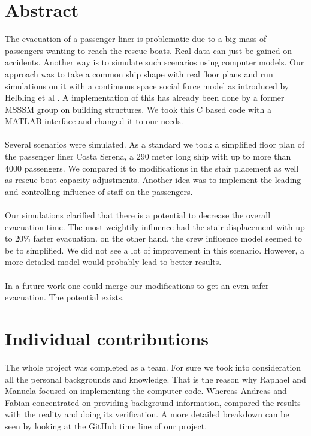 \documentclass[11pt]{article}
\begin{document}
\section{Abstract}
The evacuation of a passenger liner is problematic due to a big mass of passengers wanting to reach the rescue boats. Real data can just be gained on accidents. Another way is to simulate such scenarios using computer models. Our approach was to take a common ship shape with real floor plans and run simulations on it with a continuous space social force model as introduced by Helbling et al \cite{EscapePanic}. A implementation of this has already been done by a former MSSSM group \cite{Building} on building structures. We took this C based code with a MATLAB interface and changed it to our needs. \\\\
Several scenarios were simulated. As a standard we took a simplified floor plan of the passenger liner Costa Serena, a 290 meter long ship with up to more than 4000 passengers. We compared it to modifications in the stair placement as well as rescue boat capacity adjustments. Another idea was to implement the leading and controlling influence of staff on the passengers.\\\\
Our simulations clarified that there is a potential to decrease the overall evacuation time. The most weightily influence had the stair displacement with up to 20\% faster evacuation. on the other hand, the crew influence model seemed to be to simplified. We did not see a lot of improvement in this scenario. However, a more detailed model would probably lead to better results.\\\\
In a future work one could merge our modifications to get an even safer evacuation. The potential exists.




\section{Individual contributions}
The whole project was completed as a team. For sure we took into consideration all the personal backgrounds and  knowledge. That is the reason why Raphael and Manuela focused on implementing the computer code. Whereas Andreas and Fabian concentrated on providing background information, compared the results with the reality and doing its verification. A more detailed breakdown can be seen by looking at the GitHub time line of our project.
\end{document}
